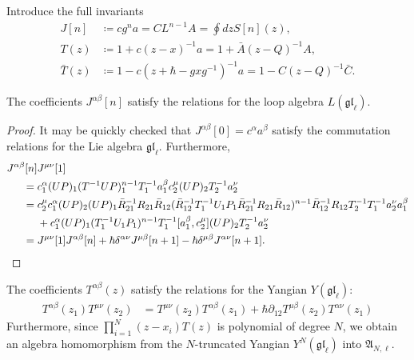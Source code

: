 \begin{definition}
Introduce the full invariants
\begin{align}
J[n] &\coloneq c g^n a = C L^{n-1} A = \oint dz S[n](z), \\
T(z) &\coloneq 1 + c (z-x)^{-1} a = 1 + \bar A (z-Q)^{-1} A, \\
\bar{T}(z) &\coloneq 1 - c (z+\hbar-gxg^{-1})^{-1} a = 1 - C (z-Q)^{-1} \bar C.
\end{align}
\end{definition}

\begin{prop}
The coefficients $J^{\alpha\beta}[n]$ satisfy the relations for the loop algebra $L(\mathfrak{gl}_\ell)$.
\end{prop}

\begin{proof}
It may be quickly checked that $J^{\alpha\beta}[0] = c^\alpha a^\beta$ satisfy the commutation relations for the Lie algebra $\mathfrak{gl}_\ell$. Furthermore,
\begin{align*}
J^{\alpha\beta}[n]& J^{\mu\nu}[1] \\
={}& c_1^\alpha (UP)_1 (T^{-1}UP)_1^{n-1} T_1^{-1} a_1^\beta c_2^\mu (UP)_2 T_2^{-1} a_2^\nu \\
={}& c_2^\mu c_1^\alpha (UP)_2 (UP)_1 \bar R_{21}^{-1} R_{21} \bar R_{12} (\bar R_{12}^{-1} T_1^{-1} U_1 P_1 \bar R_{21}^{-1} R_{21} \bar R_{12})^{n-1} \bar R_{12}^{-1} R_{12} T_2^{-1} T_1^{-1} a_2^\nu a_1^\beta \\
&+ c_1^\alpha (UP)_1 (T_1^{-1} U_1 P_1)^{n-1} T_1^{-1} [a_1^\beta,c_2^\mu] (UP)_2 T_2^{-1} a_2^\nu \\
={}& J^{\mu\nu}[1] J^{\alpha\beta}[n] + \hbar \delta^{\alpha\nu} J^{\mu\beta}[n+1] - \hbar \delta^{\mu\beta} J^{\alpha\nu}[n+1]. \qedhere
\end{align*}
\end{proof}

\begin{prop}
The coefficients $T^{\alpha\beta}(z)$
satisfy the relations for the Yangian $Y(\mathfrak{gl}_\ell)$:
\begin{align}
T^{\alpha\beta}(z_1) T^{\mu\nu}(z_2) &= T^{\mu\nu}(z_2) T^{\alpha\beta}(z_1) + \hbar\partial_{12}T^{\mu\beta}(z_2) T^{\alpha\nu}(z_1)
\end{align}
Furthermore, since $\prod_{i=1}^N (z-x_i) T(z)$ is polynomial of degree $N$, we obtain an algebra homomorphism from the $N$-truncated Yangian $Y^N(\mathfrak{gl}_\ell)$ into $\mathfrak{A}_{N,\ell}$.
\end{prop}

